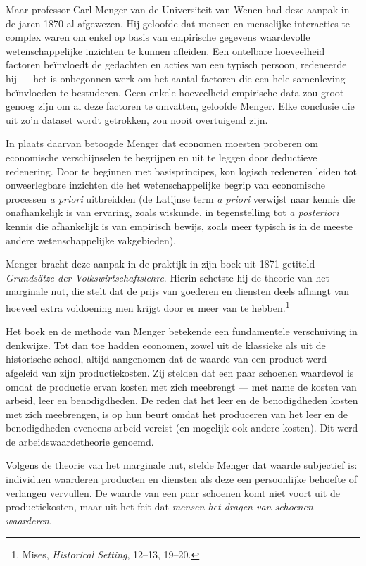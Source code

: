 \documentclass[
  a5paper,
  smalldemyvopaper,11pt,twoside,onecolumn,openright,extrafontsizes,
hidelinks]{memoir}
\begin{document}
Maar professor Carl Menger van de Universiteit van Wenen had deze aanpak
in de jaren 1870 al afgewezen. Hij geloofde dat mensen en menselijke
interacties te complex waren om enkel op basis van empirische gegevens
waardevolle wetenschappelijke inzichten te kunnen afleiden. Een
ontelbare hoeveelheid factoren beïnvloedt de gedachten en acties van een
typisch persoon, redeneerde hij --- het is onbegonnen werk om het aantal
factoren die een hele samenleving beïnvloeden te bestuderen. Geen enkele
hoeveelheid empirische data zou groot genoeg zijn om al deze factoren te
omvatten, geloofde Menger. Elke conclusie die uit zo'n dataset wordt
getrokken, zou nooit overtuigend zijn.

In plaats daarvan betoogde Menger dat economen moesten proberen om
economische verschijnselen te begrijpen en uit te leggen door deductieve
redenering. Door te beginnen met basisprincipes, kon logisch redeneren
leiden tot onweerlegbare inzichten die het wetenschappelijke begrip van
economische processen \emph{a priori} uitbreidden (de Latijnse term
\emph{a priori} verwijst naar kennis die onafhankelijk is van ervaring,
zoals wiskunde, in tegenstelling tot \emph{a posteriori} kennis die
afhankelijk is van empirisch bewijs, zoals meer typisch is in de meeste
andere wetenschappelijke vakgebieden).

Menger bracht deze aanpak in de praktijk in zijn boek uit 1871 getiteld
\emph{Grundsätze der Volkswirtschaftslehre}. Hierin schetste hij de
theorie van het marginale nut, die stelt dat de prijs van goederen en
diensten deels afhangt van hoeveel extra voldoening men krijgt door er
meer van te hebben.\footnote{\hspace{0pt}Mises, \emph{Historical
  Setting}, 12--13, 19--20.}

Het boek en de methode van Menger betekende een fundamentele
verschuiving in denkwijze. Tot dan toe hadden economen, zowel uit de
klassieke als uit de historische school, altijd aangenomen dat de waarde
van een product werd afgeleid van zijn productiekosten. Zij stelden dat
een paar schoenen waardevol is omdat de productie ervan kosten met zich
meebrengt --- met name de kosten van arbeid, leer en benodigdheden. De
reden dat het leer en de benodigdheden kosten met zich meebrengen, is op
hun beurt omdat het produceren van het leer en de benodigdheden eveneens
arbeid vereist (en mogelijk ook andere kosten). Dit werd de
arbeidswaardetheorie genoemd.

Volgens de theorie van het marginale nut, stelde Menger dat waarde
subjectief is: individuen waarderen producten en diensten als deze een
persoonlijke behoefte of verlangen vervullen. De waarde van een paar
schoenen komt niet voort uit de productiekosten, maar uit het feit dat
\emph{mensen het dragen van schoenen waarderen}.
\end{document}
